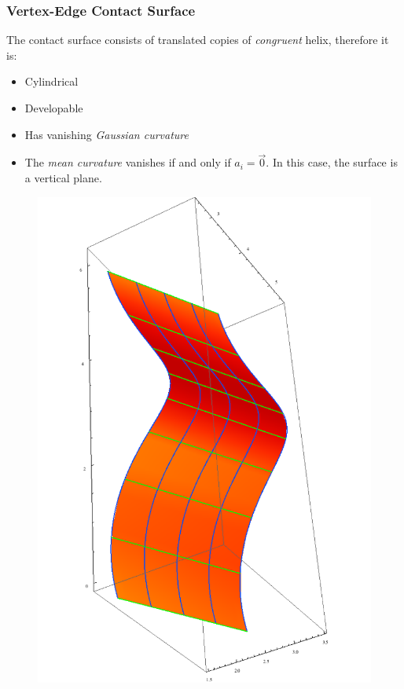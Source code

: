 \documentclass[ucs,9pt,pagenumbersfull]{beamer}
\begin{document}
\begin{frame}
  \frametitle{Vertex-Edge Contact Surface}
  \begin{minipage}{0.63\linewidth}
    The contact surface consists of translated copies of \emph{congruent}
    helix, therefore it is:
    \begin{itemize}
    \item Cylindrical
    \item Developable
    \item Has vanishing \emph{Gaussian curvature}
    \item The \emph{mean curvature} vanishes if and only if \(a_i = \vec{0}\). In this case, the surface is a vertical plane.
    \end{itemize}
  \end{minipage}
  \hfill
  \begin{minipage}{0.35\linewidth}
    \begin{figure}
      \centering
      \includegraphics[height=0.9\textheight]{Figures/ve-full-contact}
    \end{figure}
  \end{minipage}
\end{frame}
\end{document}

